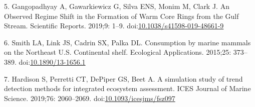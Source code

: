 \documentclass[
  10pt,
]{article}
\begin{document}
\leavevmode\hypertarget{ref-gangopadhyay_observed_2019}{}%
5. Gangopadhyay A, Gawarkiewicz G, Silva ENS, Monim M, Clark J. An
Observed Regime Shift in the Formation of Warm Core Rings from the Gulf
Stream. Scientific Reports. 2019;9: 1--9.
doi:\href{https://doi.org/10.1038/s41598-019-48661-9}{10.1038/s41598-019-48661-9}

\leavevmode\hypertarget{ref-smith_consumption_2015}{}%
6. Smith LA, Link JS, Cadrin SX, Palka DL. Consumption by marine mammals
on the Northeast U.S. Continental shelf. Ecological Applications.
2015;25: 373--389.
doi:\href{https://doi.org/10.1890/13-1656.1}{10.1890/13-1656.1}

\leavevmode\hypertarget{ref-hardison_simulation_2019}{}%
7. Hardison S, Perretti CT, DePiper GS, Beet A. A simulation study of
trend detection methods for integrated ecosystem assessment. ICES
Journal of Marine Science. 2019;76: 2060--2069.
doi:\href{https://doi.org/10.1093/icesjms/fsz097}{10.1093/icesjms/fsz097}
\end{document}

